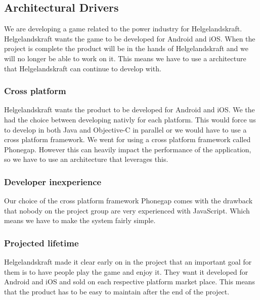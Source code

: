 \subsection{Architectural Drivers}
We are developing a game related to the power industry for Helgelandskraft. Helgelandskraft wants the game to be developed for Android and iOS. When the project is complete the product will be in the hands of Helgelandskraft and we will no longer be able to work on it. This means we have to use a architecture that Helgelandskraft can continue to develop with.

\subsubsection{Cross platform}
Helgelandskraft wants the product to be developed for Android and iOS. We the had the choice between developing nativly for each platform. This would force us to develop in both Java and Objective-C in parallel or we would have to use a cross platform framework. We went for using a cross platform framework called Phonegap. However this can heavily impact the performance of the application, so we have to use an architecture that leverages this.

\subsubsection{Developer inexperience}
Our choice of the cross platform framework Phonegap comes with the drawback that nobody on the project group are very experienced with JavaScript. Which means we have to make the system fairly simple.

\subsubsection{Projected lifetime}
Helgelandskraft made it clear early on in the project that an important goal for them is to have people play the game and enjoy it. They want it developed for Android and iOS and sold on each respective platform market place. This means that the product has to be easy to maintain after the end of the project.
